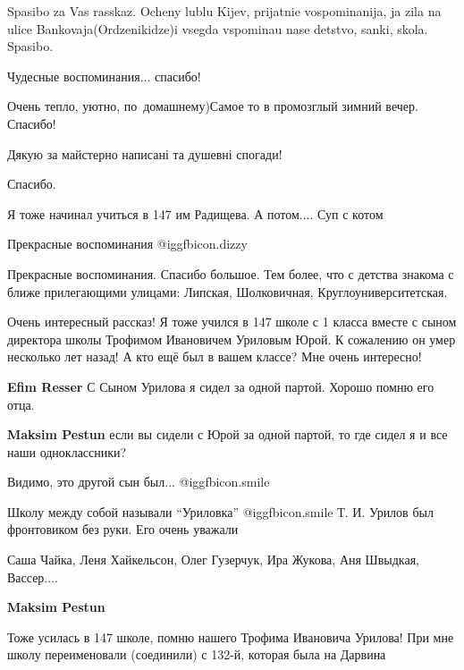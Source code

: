 \begin{itemize}

Spasibo za Vas rasskaz. Ocheny lublu Kijev, prijatnie vospominanija, ja zila na
ulice Bankovaja(Ordzenikidze)i vsegda vspominau nase detstvo, sanki, skola.
Spasibo.

Чудесные воспоминания... спасибо!

Очень тепло, уютно, по~домашнему)Самое то в промозглый зимний вечер. Спасибо!

Дякую за майстерно написані та душевні спогади!

Спасибо.

Я тоже начинал учиться в 147 им Радищева. А потом.... Суп с котом

Прекрасные воспоминания @igg{fbicon.dizzy} 


Прекрасные воспоминания. Спасибо большое. Тем более, что с детства знакома с
ближе прилегающими улицами: Липская, Шолковичная, Круглоуниверситетская.



Очень интересный рассказ! Я тоже учился в 147 школе с 1 класса вместе с сыном
директора школы Трофимом Ивановичем Уриловым Юрой. К сожалению он умер
несколько лет назад! А кто ещё был в вашем классе? Мне очень интересно!

\begin{itemize} %
\textbf{Efim Resser} С Сыном Урилова я сидел за одной партой. Хорошо помню его отца.

\textbf{Maksim Pestun} если вы сидели с Юрой за одной партой, то где сидел я и все наши одноклассники?

Видимо, это другой сын был... @igg{fbicon.smile} 

Школу между собой называли \enquote{Уриловка} @igg{fbicon.smile}  Т. И. Урилов
был фронтовиком без руки. Его очень уважали

\begin{itemize} %
Саша Чайка, Леня Хайкельсон, Олег Гузерчук, Ира Жукова, Аня Швыдкая, Вассер....

\textbf{Maksim Pestun} 

Тоже усилась в 147 школе, помню нашего Трофима Ивановича Урилова! При мне школу
переименовали (соединили) с 132-й, которая была на Дарвина


\end{itemize}
\end{itemize}
\end{itemize}
